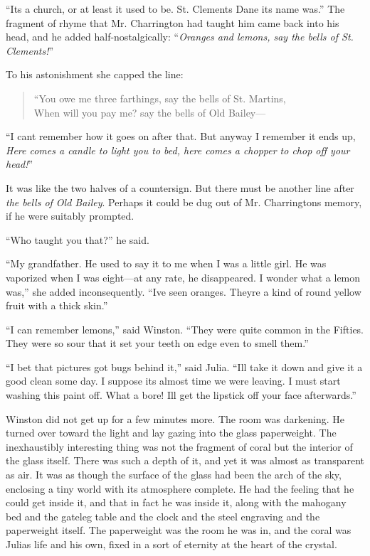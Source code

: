 ``It\textquotesingle s a church, or at least it used to be. St.
Clement\textquotesingle s Dane its name was.'' The fragment of rhyme that
Mr. Charrington had taught him came back into his head, and he added
half-nostalgically: ``\emph{Oranges and lemons, say the bells of St.
Clement\textquotesingle s!}''

To his astonishment she capped the line:

\begin{quotation}
  ``You owe me three farthings, say the bells of St.
  Martin\textquotesingle s,\\
  When will you pay me? say the bells of Old Bailey---
\end{quotation}

``I can\textquotesingle t remember how it goes on after that. But anyway
I remember it ends up, \emph{Here comes a candle to light you to bed,
here comes a chopper to chop off your head!}''

It was like the two halves of a countersign. But there must be another
line after \emph{the bells of Old Bailey}. Perhaps it could be dug out
of Mr. Charrington\textquotesingle s memory, if he were suitably
prompted.

``Who taught you that?'' he said.

``My grandfather. He used to say it to me when I was a little girl. He
was vaporized when I was eight---at any rate, he disappeared. I wonder
what a lemon was,'' she added inconsequently. ``I\textquotesingle ve seen
oranges. They\textquotesingle re a kind of round yellow fruit with a
thick skin.''

``I can remember lemons,'' said Winston. ``They were quite common in the
Fifties. They were so sour that it set your teeth on edge even to smell
them.''

``I bet that picture\textquotesingle s got bugs behind it,'' said Julia.
``I\textquotesingle ll take it down and give it a good clean some day. I
suppose it\textquotesingle s almost time we were leaving. I must start
washing this paint off. What a bore! I\textquotesingle ll get the
lipstick off your face afterwards.''

Winston did not get up for a few minutes more. The room was darkening.
He turned over toward the light and lay gazing into the glass
paperweight. The inexhaustibly interesting thing was not the fragment of
coral but the interior of the glass itself. There was such a depth of
it, and yet it was almost as transparent as air. It was as though the
surface of the glass had been the arch of the sky, enclosing a tiny
world with its atmosphere complete. He had the feeling that he could get
inside it, and that in fact he was inside it, along with the mahogany
bed and the gateleg table and the clock and the steel engraving and the
paperweight itself. The paperweight was the room he was in, and the
coral was Julia\textquotesingle s life and his own, fixed in a sort of
eternity at the heart of the crystal.


